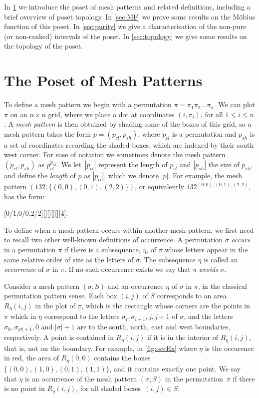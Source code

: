 \documentclass[preprint,11pt]{elsarticle}
\newcommand\cl[1]{#1_{cl}}
\newcommand\sh[1]{#1_{sh}}
\numberwithin{equation}{section}
\numberwithin{figure}{section}
\numberwithin{thm}{section}
\begin{document}
In \cref{sec:PosMP} we introduce the poset of mesh patterns and related definitions,
including a brief overview of poset topology. In \cref{sec:MF} we prove some results
on the M\"obius function of this poset. In \cref{sec:purity} we give
a characterisation of the non-pure (or non-ranked) intervals of the poset.
In \cref{sec:topology} we give some results on the topology of the poset.



\section{The Poset of Mesh Patterns}\label{sec:PosMP}
To define a mesh pattern we begin with a permutation
$\pi=\pi_1\pi_2\ldots\pi_n$. We can plot $\pi$ on an $n\times n$ grid,
where we place a dot at coordinates $(i,\pi_i)$, for all $1\le i\le n$.
A \emph{mesh pattern} is then obtained by shading some of the boxes of this grid, so a mesh
pattern takes the form $p=(\cl{p},\sh{p})$, where $\cl{p}$ is a permutation
and $\sh{p}$ is a set of coordinates recording the shaded boxes, which are indexed
by their south west corner. For ease of notation we sometimes denote the mesh
pattern $(\cl{p},\sh{p})$ as $\cl{p}^{\sh{p}}$. We let~$|\cl{p}|$ represent the length of $\cl{p}$
and $|\sh{p}|$ the size of $\sh{p}$, and define the \emph{length} of $p$ as $|\cl{p}|$, which we denote $|p|$.
For example, the mesh pattern $(132,\{(0,0),(0,1),(2,2)\})$,
or equivalently $132^{(0,0),(0,1),(2,2)}$, has the form:
\begin{center}
[0/1,0/0,2/2][][][][][4].
\end{center}

To define when a mesh pattern occurs within another mesh pattern, we first need to
recall two other well-known definitions of occurrence. A permutation $\sigma$
\emph{occurs} in a permutation $\pi$ if there is a subsequence, $\eta$, of $\pi$ whose letters
appear in the same relative order of size as the letters of $\sigma$. The subsequence
$\eta$ is called an \emph{occurrence} of $\sigma$ in $\pi$. If no such occurrence exists
we say that $\pi$ \emph{avoids} $\sigma$.

Consider a mesh pattern $(\sigma,S)$ and an occurrence $\eta$ of $\sigma$ in $\pi$, in the
classical permutation pattern sense. Each box $(i,j)$ of $S$ corresponds to an
area $R_{\eta}(i,j)$ in the plot of $\pi$, which is the rectangle whose corners are the points in $\pi$
which in $\eta$ correspond to the letters $\sigma_i,\sigma_{i+1},j,j+1$ of $\sigma$, and the letters $\sigma_0,\sigma_{|\sigma|+1},0$ and $|\sigma|+1$ are to the south, north, east and west boundaries, respectively.
A point is contained in $R_\eta(i,j)$ if it is in the interior of $R_\eta(i,j)$, that is, not on the boundary.
For example, in \cref{fig:occEx} where $\eta$ is the occurence in red, the area
of $R_\eta(0,0)$ contains the boxes $\{(0,0),(1,0),(0,1),(1,1)\}$, and it contains exactly one point.
We say that $\eta$ is an occurrence of the mesh pattern $(\sigma,S)$ in the permutation~$\pi$
if there is no point in $R_{\eta}(i,j)$, for all shaded boxes~$(i,j)\in S$.
\end{document}
